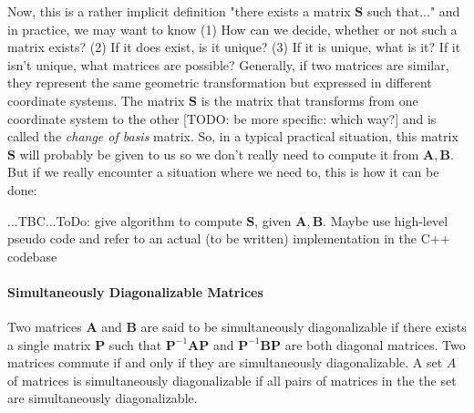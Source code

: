 \medskip
Now, this is a rather implicit definition "there exists a matrix $\mathbf{S}$ such that..." and in practice, we may want to know (1) How can we decide, whether or not such a matrix exists? (2) If it does exist, is it unique? (3) If it is unique, what is it? If it isn't unique, what matrices are possible? Generally, if two matrices are similar, they represent the same geometric transformation but expressed in different coordinate systems. The matrix $\mathbf{S}$ is the matrix that transforms from one coordinate system to the other [TODO: be more specific: which way?] and is called the \emph{change of basis} matrix. So, in a typical practical situation, this matrix $\mathbf{S}$ will probably be given to us so we don't really need to compute it from $\mathbf{A,B}$. But if we really encounter a situation where we need to, this is how it can be done:

...TBC...ToDo: give algorithm to compute $\mathbf{S}$, given $\mathbf{A,B}$. Maybe use high-level pseudo code and refer to an actual (to be written) implementation in the C++ codebase 








\paragraph{Simultaneously Diagonalizable Matrices}
Two matrices $\mathbf{A}$ and $\mathbf{B}$ are said to be simultaneously diagonalizable if there exists a single matrix $\mathbf{P}$ such that $\mathbf{P}^{-1} \mathbf{A} \mathbf{P}$ and  $\mathbf{P}^{-1} \mathbf{B} \mathbf{P}$ are both diagonal matrices. Two matrices commute if and only if they are simultaneously diagonalizable. A set $A$ of matrices is simultaneously diagonalizable if all pairs of matrices in the the set are simultaneously diagonalizable. 

